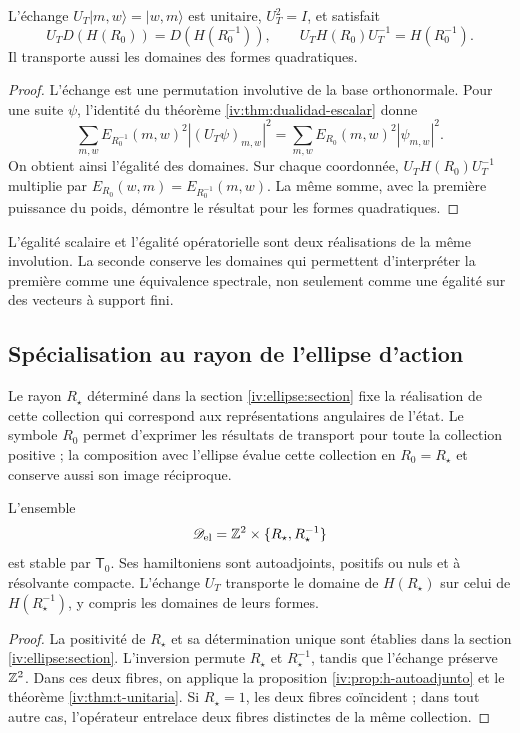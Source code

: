 \begin{theorem}
\label{iv:thm:t-unitaria}
\label{prop:dualidad-radios-k}
L’échange
\(U_T|m,w\rangle=|w,m\rangle\) est unitaire,
\(U_T^2=I\), et satisfait
\begin{equation}
 U_TD(H(R_0))=D(H(R_0^{-1})),
 \qquad U_TH(R_0)U_T^{-1}=H(R_0^{-1}).
 \label{iv:eq:conjugacion-h}
\end{equation}
Il transporte aussi les domaines des formes quadratiques.
\end{theorem}
\begin{proof}
L’échange est une permutation involutive de la base
orthonormale. Pour une suite \(\psi\), l’identité du
théorème \ref{iv:thm:dualidad-escalar} donne
\[
 \sum_{m,w}E_{R_0^{-1}}(m,w)^2|(U_T\psi)_{m,w}|^2
 =\sum_{m,w}E_{R_0}(m,w)^2|\psi_{m,w}|^2.
\]
On obtient ainsi l’égalité des domaines. Sur chaque coordonnée,
\(U_TH(R_0)U_T^{-1}\) multiplie par
\(E_{R_0}(w,m)=E_{R_0^{-1}}(m,w)\). La même somme, avec
la première puissance du poids, démontre le résultat pour les
formes quadratiques.
\end{proof}

L’égalité scalaire et l’égalité opératorielle sont deux réalisations
de la même involution. La seconde conserve les domaines qui
permettent d’interpréter la première comme une équivalence spectrale,
non seulement comme une égalité sur des vecteurs à support fini.

\subsection{Spécialisation au rayon de l’ellipse d’action}

Le rayon \(R_\star\) déterminé dans la section
\ref{iv:ellipse:section} fixe la réalisation de cette collection qui
correspond aux représentations angulaires de l’état. Le symbole
\(R_0\) permet d’exprimer les résultats de transport pour toute la
collection positive ; la composition avec l’ellipse évalue cette collection en
\(R_0=R_\star\) et conserve aussi son image réciproque.

\begin{corollary}
\label{iv:cor:radio-especializado}
L'ensemble
\[
 \mathscr D_{\mathrm{el}}
 =\mathbb Z^2\times\{R_\star,R_\star^{-1}\}
\]
est stable par \(\mathsf T_0\). Ses hamiltoniens sont autoadjoints,
positifs ou nuls et à résolvante compacte. L’échange \(U_T\)
transporte le domaine de \(H(R_\star)\) sur celui de
\(H(R_\star^{-1})\), y compris les domaines de leurs formes.

\end{corollary}
\begin{proof}
La positivité de \(R_\star\) et sa détermination unique sont établies
dans la section \ref{iv:ellipse:section}. L’inversion permute
\(R_\star\) et \(R_\star^{-1}\), tandis que l’échange préserve
\(\mathbb Z^2\). Dans ces deux fibres, on applique la proposition
\ref{iv:prop:h-autoadjunto} et le théorème \ref{iv:thm:t-unitaria}.
Si \(R_\star=1\), les deux fibres coïncident ; dans tout autre cas,
l’opérateur entrelace deux fibres distinctes de la même collection.
\end{proof}

